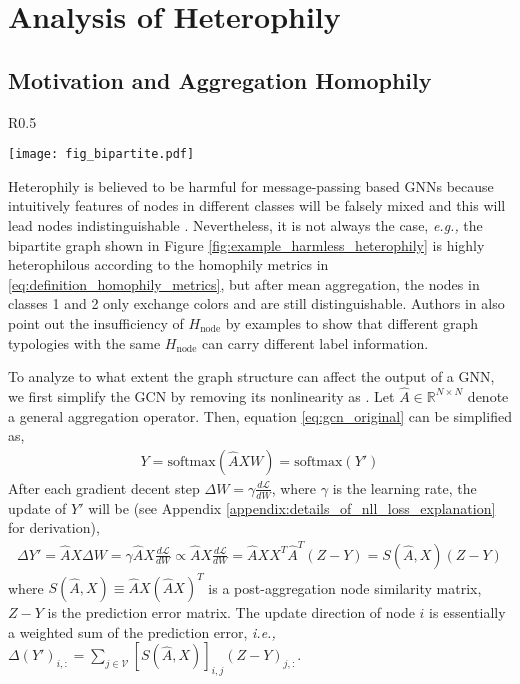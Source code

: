 \documentclass{article}
\newcommand\ie{\textit{i.e.,}}
\newcommand\eg{\textit{e.g.,}}
\newcommand{\0}{{\boldsymbol{0}}}
\newcommand{\6}{{\partial}}
\newcommand{\8}{{\infty}}
\newcommand{\4}{{\nabla}}
\begin{document}
\section{Analysis of Heterophily}
\label{sec:heterophily_analysis}
\subsection{Motivation and Aggregation Homophily}
\begin{wrapfigure}{R}{0.5\textwidth}
  \begin{center}
    \texttt{[image: fig\_bipartite.pdf]}
  \end{center}
  \caption{Example of harmless heterophily}
  \label{fig:example_harmless_heterophily}
\end{wrapfigure}

Heterophily is believed to be harmful for message-passing based GNNs \cite{zhu2020beyond,pei2020geom,chien2021adaptive} because intuitively features of nodes in different classes will be falsely mixed and this will lead nodes indistinguishable \cite{zhu2020beyond}.
Nevertheless, it is not always the case, \eg{} the bipartite graph shown in Figure \ref{fig:example_harmless_heterophily} is highly heterophilous according to the homophily metrics in \eqref{eq:definition_homophily_metrics}, but after mean aggregation, the nodes in classes 1 and 2 only exchange colors and are still distinguishable. Authors in \cite{chien2021adaptive} also point out the insufficiency of $H_\text{node}$ by examples to show that different graph typologies with the same $H_\text{node}$ can carry different label information. 

To analyze to what extent the graph structure can affect the output of a GNN, we first simplify the GCN by removing its nonlinearity as \cite{wu2019simplifying}. Let $\hat{A} \in \mathbb{R}^{N\times N}$ denote a general aggregation operator. Then, equation \eqref{eq:gcn_original} can be simplified as,
\begin{equation}
    \begin{aligned}
    Y  = \text{softmax} (\hat{A}  X W ) = \text{softmax} (Y')
    \end{aligned}
\end{equation}
After each gradient decent step $\Delta W = \gamma \frac{d \mathcal{L}}{d W}$, where $\gamma$ is the learning rate, the update of $Y'$ will be (see Appendix \ref{appendix:details_of_nll_loss_explanation} for  derivation),
\begin{equation}
    \begin{aligned}
    \label{eq:gradient_descent_update}
    \Delta Y' = \hat{A} X \Delta W = \gamma \hat{A}X \frac{d \mathcal{L}}{d W} \propto \hat{A}X \frac{d \mathcal{L}}{d W} = \hat{A}X X^T\hat{A}^T (Z-Y) = S(\hat{A},X) (Z-Y)
    \end{aligned}
\end{equation}
where $S(\hat{A},X) \equiv \hat{A}X (\hat{A}X)^T$ is a post-aggregation node similarity matrix, $Z-Y$ is the prediction error matrix. The update direction of node $i$ is essentially a weighted sum of the prediction error, \ie{} $\Delta (Y')_{i,:} = \sum_{j\in \mathcal{V}} \left[S(\hat{A},X)\right]_{i,j} (Z-Y)_{j,:}$. 
\end{document}
